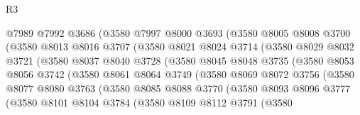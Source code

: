 \begin{lexlean}{R3}
\begin{coremodule}
                    @7989
                    @7992
                    @3686
                    (@3580
                      @7997
                      @8000
                      @3693
                      (@3580
                        @8005
                        @8008
                        @3700
                        (@3580
                          @8013
                          @8016
                          @3707
                          (@3580
                            @8021
                            @8024
                            @3714
                            (@3580
                              @8029
                              @8032
                              @3721
                              (@3580
                                @8037
                                @8040
                                @3728
                                (@3580
                                  @8045
                                  @8048
                                  @3735
                                  (@3580
                                    @8053
                                    @8056
                                    @3742
                                    (@3580
                                      @8061
                                      @8064
                                      @3749
                                      (@3580
                                        @8069
                                        @8072
                                        @3756
                                        (@3580
                                          @8077
                                          @8080
                                          @3763
                                          (@3580
                                            @8085
                                            @8088
                                            @3770
                                            (@3580
                                              @8093
                                              @8096
                                              @3777
                                              (@3580
                                                @8101
                                                @8104
                                                @3784
                                                (@3580
                                                  @8109
                                                  @8112
                                                  @3791
                                                  (@3580

\end{coremodule}
\end{lexlean}
